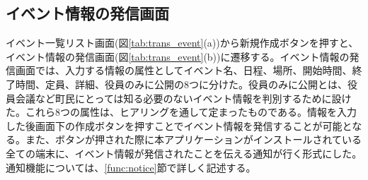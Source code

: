 \subsection{イベント情報の発信画面}%
イベント一覧リスト画面(図\ref{tab:trans_event}(a))から新規作成ボタンを押すと、イベント情報の発信画面(図\ref{tab:trans_event}(b))に遷移する。イベント情報の発信画面では、入力する情報の属性としてイベント名、日程、場所、開始時間、終了時間、定員、詳細、役員のみに公開の8つに分けた。役員のみに公開とは、役員会議など町民にとっては知る必要のないイベント情報を判別するために設けた。これら8つの属性は、ヒアリングを通して定まったものである。情報を入力した後画面下の作成ボタンを押すことでイベント情報を発信することが可能となる。また、ボタンが押された際に本アプリケーションがインストールされている全ての端末に、イベント情報が発信されたことを伝える通知が行く形式にした。通知機能については、\ref{func:notice}節で詳しく記述する。

